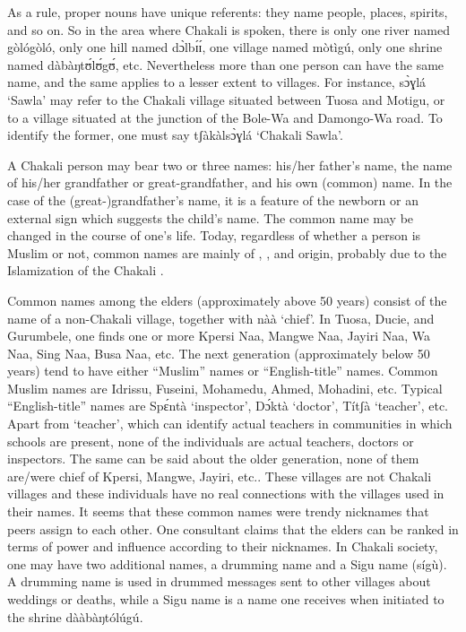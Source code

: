 \begin{exe}
\begin{exe}
\begin{exe}
\begin{exe}
\begin{exe}
\begin{exe}
\begin{exe}
As a rule,   proper nouns have  unique referents:  they  name people, places, spirits, and so on.  So in the area where Chakali is spoken, there is only one river named {\sls gòlógòló}, only one hill named {\sls dɔ̀lbɪ́ɪ́}, one village named {\sls mòtìgú},  only one shrine named {\sls dàbàŋtʊ́lʊ́gʊ́}, etc.  Nevertheless more than one person can have the same name, and the same applies to a lesser extent to villages. For instance, {\sls sɔ̀ɣlá} `Sawla' may refer to the Chakali village situated between Tuosa and Motigu, or to a  village situated at the junction of the Bole-Wa and Damongo-Wa road. To identify the former, one must say {\sls tʃàkàlsɔ̀ɣlá} `Chakali Sawla'. 

A  Chakali person may bear two or three names: his/her father's name, the name of his/her grandfather or great-grandfather, and his own (common) name. In the case of the (great-)grandfather's name, it is a feature of the newborn or an external sign which suggests the child's name.  The common name may be changed in the course of one's life. Today, regardless of whether a  person is Muslim or not, common names are mainly of , , and  origin, probably due to the Islamization of the Chakali  \citep{brin15c}.


Common names among the  elders (approximately above 50 years) consist of the name of a non-Chakali village,  together with {\sls nàà} `chief'. In Tuosa, Ducie, and Gurumbele, one finds one or more Kpersi Naa, Mangwe Naa, Jayiri Naa, Wa Naa, Sing Naa,  Busa Naa, etc. The next generation (approximately below 50 years) tend to have either ``Muslim'' names or ``English-title'' names. Common Muslim names are Idrissu, Fuseini, Mohamedu, Ahmed, Mohadini, etc.  Typical ``English-title'' names are {\sls Spɛ́ntà} `inspector',  {\sls Dɔ́ktà} `doctor', {\sls Títʃà} `teacher', etc. Apart from `teacher',  which can identify actual teachers in communities in which schools are present, none of the individuals are actual teachers, doctors or inspectors. The same can be said about the older generation, none of them are/were chief of Kpersi, Mangwe, Jayiri, etc.. These villages are not Chakali villages and these individuals have no real connections with the villages used in their names. It seems that these common names were trendy  nicknames that peers  assign to each other. One consultant claims that the elders can be ranked in terms of power and influence according to their nicknames. In Chakali society, one may have two additional names, a drumming name and a Sigu name ({\sls sígù}). A drumming name is used in drummed messages sent to other villages about weddings or deaths,  while a Sigu name is a name one receives when initiated to the shrine {\sls  dààbàŋtólúgú}. 



\end{exe}
\end{exe}
\end{exe}
\end{exe}
\end{exe}
\end{exe}
\end{exe}
